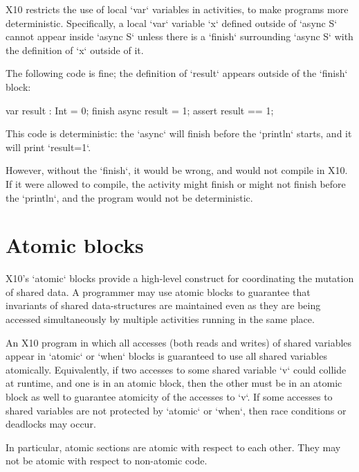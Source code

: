 X10 restricts the use of local \xcd`var` variables in activities, to make
programs more deterministic. Specifically, a local \xcd`var` variable \xcd`x`
defined outside of \xcd`async S` cannot appear inside \xcd`async S` unless
there is a \xcd`finish` surrounding \xcd`async S` with the definition of
\xcd`x` outside of it.

\begin{ex}
The following code is fine; the definition of \xcd`result` appears outside of
the \xcd`finish` block: 
\begin{xten}
var result : Int = 0;
finish { 
  async result = 1;
}
assert result == 1;
\end{xten}

This code is deterministic: the \xcd`async` will finish before the
\xcd`println` starts, and it will print \xcd`result=1`.  

However, without the
\xcd`finish`, it would be wrong, and would not compile in X10.  If it were
allowed to compile, the activity might finish or might not finish before the
\xcd`println`, and the program would not be deterministic.
\end{ex}


\section{Atomic blocks}\label{AtomicBlocks}

X10's \xcd`atomic` blocks provide a high-level construct for coordinating
the mutation of shared data. 
A programmer may use atomic blocks to guarantee that invariants of
shared data-structures are maintained even as they are being accessed
simultaneously by multiple activities running in the same place.  

An X10 program in which all accesses (both reads and writes) of shared
variables appear in \xcd`atomic` or \xcd`when` blocks is guaranteed to use all
shared variables atomically.  Equivalently, 
if two accesses to some shared variable \xcd`v` could collide at runtime, and
one is in an atomic block, then the other must be in an atomic block as well
to guarantee atomicity of the accesses to \xcd`v`. 
If some accesses to shared variables are not
protected by \xcd`atomic` or \xcd`when`, then race conditions or deadlocks may
occur.  

In particular, atomic sections are atomic with respect to each other. They may
not be atomic with respect to non-atomic code.  

